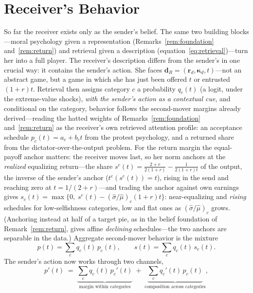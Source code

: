 \documentclass[11pt]{article}
\theoremstyle{plain}
\theoremstyle{remark}
\begin{document}
\section{Receiver's Behavior}
\label{sec:receiver}

So far the receiver exists only as the sender's belief. The same two building blocks---moral psychology given a representation (Remarks~\ref{rem:foundation} and~\ref{rem:return}) and retrieval given a description (equation~\eqref{eq:retrieval})---turn her into a full player. The receiver's description differs from the sender's in one crucial way: it contains the sender's action. She faces $\mathbf{d}_R=(\mathbf{r}_d,\boldsymbol{\kappa}_d,t)$---not an abstract game, but a game in which she has just been offered $t$ or entrusted $(1+r)t$. Retrieval then assigns category $c$ a probability $q_c(t)$ (a logit, under the extreme-value shocks), \emph{with the sender's action as a contextual cue}, and conditional on the category, behavior follows the second-mover margins already derived---reading the hatted weights of Remarks~\ref{rem:foundation} and~\ref{rem:return} as the receiver's own retrieved attention profile: an acceptance schedule $p_c(t)=a_c+b_c t$ from the protest psychology, and a returned share from the dictator-over-the-output problem. For the return margin the equal-payoff anchor matters: the receiver moves last, so her norm anchors at the \emph{realized} equalizing return---the share $s^{e}(t)=\tfrac{2+r}{2(1+r)}-\tfrac{1}{2(1+r)t}$ of the output, the inverse of the sender's anchor ($t^{e}(s^{e}(t))=t$), rising in the send and reaching zero at $t=1/(2+r)$---and trading the anchor against own earnings gives $s_c(t)=\max\bigl\{0,\;s^{e}(t)-(\hat\sigma/\hat\mu)_c(1+r)t\bigr\}$: near-equalizing and \emph{rising} schedules for low-selfishness categories, low and flat ones as $(\hat\sigma/\hat\mu)_c$ grows. (Anchoring instead at half of a target pie, as in the belief foundation of Remark~\ref{rem:return}, gives affine \emph{declining} schedules---the two anchors are separable in the data.) Aggregate second-mover behavior is the mixture
\begin{equation}
p(t)=\sum_c q_c(t)\,p_c(t),\qquad s(t)=\sum_c q_c(t)\,s_c(t).
\label{eq:receiver_mixture}
\end{equation}
The sender's action now works through two channels,
\begin{equation*}
p'(t)\;=\;\underbrace{\sum_c q_c(t)\,p_c'(t)}_{\text{margin within categories}}\;+\;\underbrace{\sum_c q_c'(t)\,p_c(t)}_{\text{composition across categories}},
\end{equation*}
\end{document}
